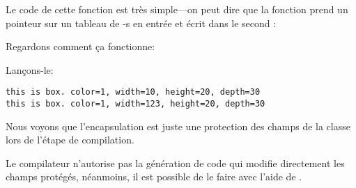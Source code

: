 Le code de cette fonction est très simple---on peut dire que la fonction prend un
pointeur sur un tableau de \Tint{}-s en entrée et écrit  dans le second \Tint{}:



Regardons comment ça fonctionne:



Lançons-le:

\begin{lstlisting}
this is box. color=1, width=10, height=20, depth=30
this is box. color=1, width=123, height=20, depth=30
\end{lstlisting}

Nous voyons que l'encapsulation est juste une protection des champs de la classe
lors de l'étape de compilation.

Le compilateur \Cpp n'autorise pas la génération de code qui modifie directement
les champs protégés, néanmoins, il est possible de le faire avec l'aide de .
